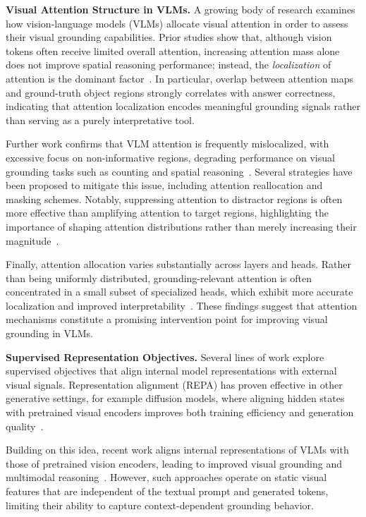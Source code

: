\textbf{Visual Attention Structure in VLMs.}
A growing body of research examines how vision-language models (VLMs) allocate visual attention in order to assess their visual grounding capabilities. Prior studies show that, although vision tokens often receive limited overall attention, increasing attention mass alone does not improve spatial reasoning performance; instead, the \emph{localization} of attention is the dominant factor~\citep{chenspatial}. In particular, overlap between attention maps and ground-truth object regions strongly correlates with answer correctness, indicating that attention localization encodes meaningful grounding signals rather than serving as a purely interpretative tool.

Further work confirms that VLM attention is frequently mislocalized, with excessive focus on non-informative regions, degrading performance on visual grounding tasks such as counting and spatial reasoning~\citep{kangsee, anwenbin2025mitigating}. Several strategies have been proposed to mitigate this issue, including attention reallocation and masking schemes. Notably, suppressing attention to distractor regions is often more effective than amplifying attention to target regions, highlighting the importance of shaping attention distributions rather than merely increasing their magnitude~\citep{sengupta2025can}.

Finally, attention allocation varies substantially across layers and heads. Rather than being uniformly distributed, grounding-relevant attention is often concentrated in a small subset of specialized heads, which exhibit more accurate localization and improved interpretability~\citep{kang2025your, kim2025interpreting}. These findings suggest that attention mechanisms constitute a promising intervention point for improving visual grounding in VLMs.

\textbf{Supervised Representation Objectives.} 
Several lines of work explore supervised objectives that align internal model representations with external visual signals. Representation alignment (REPA) has proven effective in other generative settings, for example diffusion models, where aligning hidden states with pretrained visual encoders improves both training efficiency and generation quality~\citep{yurepresentation}.

Building on this idea, recent work aligns internal representations of VLMs with those of pretrained vision encoders, leading to improved visual grounding and multimodal reasoning~\citep{yoon2025visual}. However, such approaches operate on static visual features that are independent of the textual prompt and generated tokens, limiting their ability to capture context-dependent grounding behavior.

